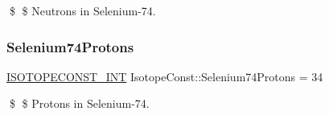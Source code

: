 \$ \$ Neutrons in Selenium-\/74. \mbox{\label{group___isotope_const-_selenium-_se74_gafad52f73b6299756964406e9b99cbe0a}} 
\subsubsection{\texorpdfstring{Selenium74\+Protons}{Selenium74Protons}}
{\footnotesize\ttfamily \mbox{\hyperlink{group___isotope_const-_macros_ga5f18360b3e99483a35c32d789e62621c}{I\+S\+O\+T\+O\+P\+E\+C\+O\+N\+S\+T\+\_\+\+I\+NT}} Isotope\+Const\+::\+Selenium74\+Protons = 34}

\$ \$ Protons in Selenium-\/74. 